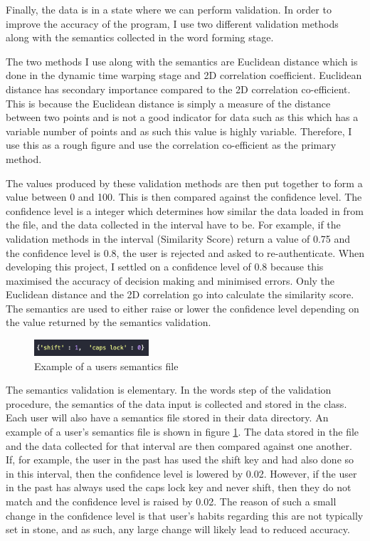 \documentclass[10pt,a4paper]{report}
\begin{document}
Finally, the data is in a state where we can perform validation. In order to improve the accuracy of the program, I use two different validation methods along with the semantics collected in the word forming stage. 

The two methods I use along with the semantics are Euclidean distance which is done in the dynamic time warping stage and 2D correlation coefficient. Euclidean distance has secondary importance compared to the 2D correlation co-efficient. This is because the Euclidean distance is simply a measure of the distance between two points and is not a good indicator for data such as this which has a variable number of points and as such this value is highly variable. Therefore, I use this as a rough figure and use the correlation co-efficient as the primary method. 

The values produced by these validation methods are then put together to form a value between 0 and 100. This is then compared against the confidence level. The confidence level is a integer which determines how similar the data loaded in from the file, and the data collected in the interval have to be. For example, if the validation methods in the interval (Similarity Score) return a value of 0.75 and the confidence level is 0.8, the user is rejected and asked to re-authenticate. When developing this project, I settled on a confidence level of 0.8 because this maximised the accuracy of decision making and minimised errors. Only the Euclidean distance and the 2D correlation go into calculate the similarity score. The semantics are used to either raise  or lower the confidence level depending on the value returned by the semantics validation.

\begin{figure}
	\begin{center}
		\includegraphics[width=0.38\textwidth]{SemanticsEx}
	\end{center}
	\caption{Example of a users semantics file}
	\label{fig:sem}
\end{figure}

The semantics validation is elementary. In the words step of the validation procedure, the semantics of the data input is collected and stored in the class. Each user will also have a semantics file stored in their data directory. An example of a user's semantics file is shown in figure \ref{fig:sem}. The data stored in the file and the data collected for that interval are then compared against one another. If, for example, the user in the past has used the shift key and had also done so in this interval, then the confidence level is lowered by 0.02. However, if the user in the past has always used the caps lock key and never shift, then they do not match and the confidence level is raised by 0.02. The reason of such a small change in the confidence level is that user's habits regarding this are not typically set in stone, and as such, any large change will likely lead to reduced accuracy.
\end{document}
